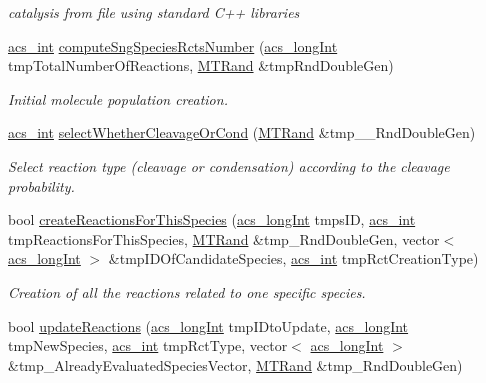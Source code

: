 \begin{DoxyCompactItemize}
\begin{DoxyCompactList}\small\item\em catalysis from file using standard C++ libraries \end{DoxyCompactList}\item 
\hyperlink{a00024_a8d277355641a098190360234e2ebde35}{acs\-\_\-int} \hyperlink{a00011_a0fd3cb062d35d2f6dd8961e95dd477b7}{compute\-Sng\-Species\-Rcts\-Number} (\hyperlink{a00024_a19319d75f02db4308bc5c0026d98cd85}{acs\-\_\-long\-Int} tmp\-Total\-Number\-Of\-Reactions, \hyperlink{a00016}{M\-T\-Rand} \&tmp\-Rnd\-Double\-Gen)
\begin{DoxyCompactList}\small\item\em Initial molecule population creation. \end{DoxyCompactList}\item 
\hyperlink{a00024_a8d277355641a098190360234e2ebde35}{acs\-\_\-int} \hyperlink{a00011_a53282cca8882e86652ab0a22e6966d17}{select\-Whether\-Cleavage\-Or\-Cond} (\hyperlink{a00016}{M\-T\-Rand} \&tmp\-\_\-\-\_\-\-Rnd\-Double\-Gen)
\begin{DoxyCompactList}\small\item\em Select reaction type (cleavage or condensation) according to the cleavage probability. \end{DoxyCompactList}\item 
bool \hyperlink{a00011_a76794f37d6d94b7504c58f0f4a4709ca}{create\-Reactions\-For\-This\-Species} (\hyperlink{a00024_a19319d75f02db4308bc5c0026d98cd85}{acs\-\_\-long\-Int} tmps\-I\-D, \hyperlink{a00024_a8d277355641a098190360234e2ebde35}{acs\-\_\-int} tmp\-Reactions\-For\-This\-Species, \hyperlink{a00016}{M\-T\-Rand} \&tmp\-\_\-\-Rnd\-Double\-Gen, vector$<$ \hyperlink{a00024_a19319d75f02db4308bc5c0026d98cd85}{acs\-\_\-long\-Int} $>$ \&tmp\-I\-D\-Of\-Candidate\-Species, \hyperlink{a00024_a8d277355641a098190360234e2ebde35}{acs\-\_\-int} tmp\-Rct\-Creation\-Type)
\begin{DoxyCompactList}\small\item\em Creation of all the reactions related to one specific species. \end{DoxyCompactList}\item 
bool \hyperlink{a00011_ace92235425bfbe692e3873ba5bb07639}{update\-Reactions} (\hyperlink{a00024_a19319d75f02db4308bc5c0026d98cd85}{acs\-\_\-long\-Int} tmp\-I\-Dto\-Update, \hyperlink{a00024_a19319d75f02db4308bc5c0026d98cd85}{acs\-\_\-long\-Int} tmp\-New\-Species, \hyperlink{a00024_a8d277355641a098190360234e2ebde35}{acs\-\_\-int} tmp\-Rct\-Type, vector$<$ \hyperlink{a00024_a19319d75f02db4308bc5c0026d98cd85}{acs\-\_\-long\-Int} $>$ \&tmp\-\_\-\-Already\-Evaluated\-Species\-Vector, \hyperlink{a00016}{M\-T\-Rand} \&tmp\-\_\-\-Rnd\-Double\-Gen)

\end{DoxyCompactItemize}
